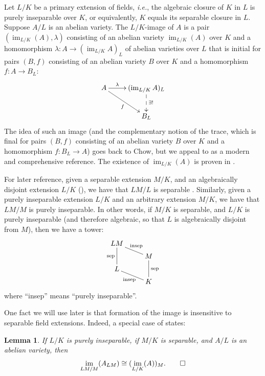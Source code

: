 \documentclass[11pt, reqno]{amsart}
\numberwithin{equation}{section}
\newtheorem{lem}[teo]{Lemma}
\theoremstyle{definition}
\theoremstyle{remark}
\DeclareMathOperator{\im}{im}
\def\iso{\cong}
\begin{document}
 Let $L/K$ be a primary extension of fields, \emph{i.e.}, the algebraic
 closure of $K$ in $L$ is purely inseparable over $K$, or equivalently, 
 $K$ equals its separable closure in $L$.  Suppose $A/L$
 is an abelian variety.  The $L/K$-image of $A$ is a pair
 $(\im_{L/K}(A),\lambda)$ consisting of an abelian variety
 $\im_{L/K}(A)$ over $K$ and a homomorphism
 $\lambda : A\to (\im_{L/K}A)_L$ of abelian varieties over $L$ that is
 initial for pairs $(B,f)$ consisting of an abelian variety $B$ over
 $K$ and a homomorphism $f:A\to B_L$:  
 \begin{equation}\label{E:lambda}
 \xymatrix{
 A \ar[rd]_f \ar[r]^<>(0.5)\lambda& (\im_{L/K}A)_L \ar@{-->}[d]^{\exists !}\\
& B_L  
 }
 \end{equation}
 The idea of such an image (and
 the complementary notion of the trace, which is final for 
  pairs $(B,f)$ consisting of an abelian variety $B$ over
 $K$ and a homomorphism $f:B_L\to A$) goes back to Chow, but we appeal to \cite{conradtrace} as a
 modern and comprehensive reference.  The existence of $\im_{L/K}(A)$
 is proven in \cite[Thm.~4.1]{conradtrace}. 
         
  For later reference, given a separable extension $M/K$, and an algebraically disjoint extension $L/K$ (\cite[Def.~5, p.V.108]{bourbakifields}), we have that $LM/L$ is separable \cite[Prop.~5, p.V.131]{bourbakifields}.
  Similarly, given a purely inseparable extension $L/K$ and an arbitrary
    extension $M/K$, we have that $LM/M$ is purely inseparable.   
    In other words, if $M/K$ is separable, and $L/K$ is purely inseparable (and therefore algebraic, so that $L$ is algebraically disjoint from $M$),  then we have a tower:
 \begin{equation}\label{E:tower}
 \xymatrix@R=.5em{
   LM \ar@{-}[dd]_{\text{sep}} \ar@{-}[dr]^{\text{insep}} \\
   & M \ar@{-}[dd]^{\text{sep}}\\
   L\ar@{-}[dr]_{\text{insep}}&\\
   &K
  }
\end{equation}
where ``insep'' means ``purely inseparable''.

        
       One fact we will use
 later is that formation of the image is insensitive to separable field
        extensions.
          Indeed, a
 special case of \cite[Thm.~5.4]{conradtrace} states:

 \begin{lem}
  \label{L:imageabvar}
  If $L/K$ is purely inseparable, if $M/K$ is separable, and $A/L$ is
  an abelian variety, then
  \[
 \im_{LM/M}(A_{LM})  \iso  (\im_{L/K}(A))_{M}. \qed
  \]
\end{lem}
\end{document}
